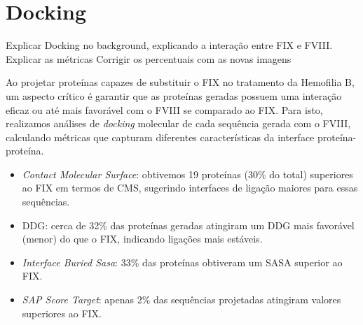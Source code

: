 \section{Docking}

{\color{red} Explicar Docking no background, explicando a interação entre FIX e FVIII. Explicar as métricas}        
{\color{red} Corrigir os percentuais com as novas imagens}        

Ao projetar proteínas capazes de substituir o FIX no tratamento da Hemofilia B, um aspecto crítico é garantir que as 
proteínas geradas possuem uma interação eficaz ou até mais favorável com o FVIII se comparado ao FIX.
Para isto, realizamos análises de \textit{docking} molecular de cada sequência gerada com o FVIII,
calculando métricas que capturam diferentes características da interface proteína-proteína. 

\begin{itemize}
    \item \textit{Contact Molecular Surface}: obtivemos 19 proteínas (30\% do total) superiores ao FIX em termos de CMS, 
    sugerindo interfaces de ligação maiores para essas sequências.
    \item DDG: cerca de 32\% das proteínas geradas atingiram um DDG mais favorável (menor) do que o FIX, indicando ligações mais estáveis.   
    \item \textit{Interface Buried Sasa}: 33\% das proteínas obtiveram um SASA superior ao FIX.
    \item \textit{SAP Score Target}: apenas 2\% das sequências projetadas atingiram valores superiores ao FIX.
  \end{itemize}


